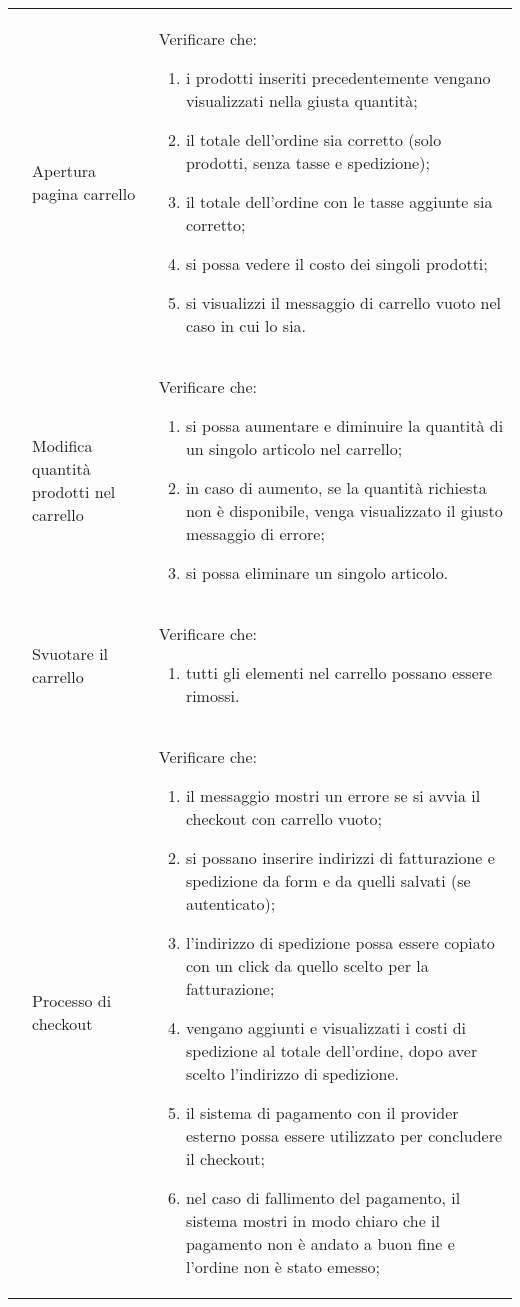 \begin{center}
\begin{longtable}{p{1cm}|p{6.85cm}|p{7cm}|}
	 & Apertura pagina carrello & Verificare che: 
	\begin{enumerate}
		\item i prodotti inseriti precedentemente vengano visualizzati nella giusta quantità;
		\item il totale dell'ordine sia corretto (solo prodotti, senza tasse e spedizione);
		\item il totale dell'ordine con le tasse aggiunte sia corretto;
		\item si possa vedere il costo dei singoli prodotti;
		\item si visualizzi il messaggio di carrello vuoto nel caso in cui lo sia.
	\end{enumerate} \\
	 & Modifica quantità prodotti nel carrello & Verificare che:
	\begin{enumerate}
		\item si possa aumentare e diminuire la quantità di un singolo articolo nel carrello;
		\item in caso di aumento, se la quantità richiesta non è disponibile, venga visualizzato il giusto messaggio di errore;
		\item si possa eliminare un singolo articolo.
	\end{enumerate}\\
	 & Svuotare il carrello & Verificare che:
	\begin{enumerate}
		\item tutti gli elementi nel carrello possano essere rimossi.
	\end{enumerate} \\
	 & Processo di checkout & Verificare che:
	\begin{enumerate}
		\item il messaggio mostri un errore se si avvia il checkout con carrello vuoto;
		\item si possano inserire indirizzi di fatturazione e spedizione da form e da quelli salvati (se autenticato);
		\item l'indirizzo di spedizione possa essere copiato con un click da quello scelto per la fatturazione;
		\item vengano aggiunti e visualizzati i costi di spedizione al totale dell'ordine, dopo aver scelto l'indirizzo di spedizione. 
		\item il sistema di pagamento con il provider esterno possa essere utilizzato per concludere il checkout;
		\item nel caso di fallimento del pagamento, il sistema mostri in modo chiaro che il pagamento non è andato a buon fine e l'ordine non è stato emesso;

\end{enumerate}
\end{longtable}
\end{center}
